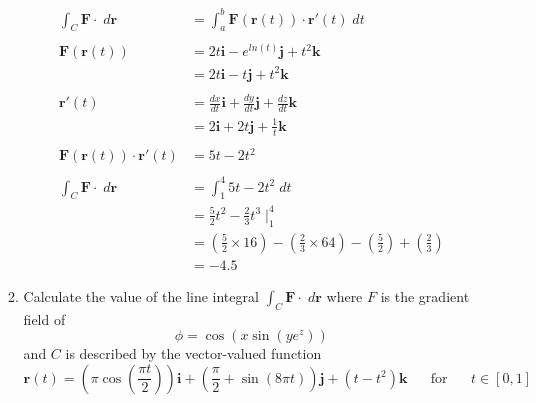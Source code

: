 \documentclass[a4paper,11pt]{article}
\begin{document}
\begin{preview}
\begin{enumerate}
\begin{enumerate}
    \begin{align*}
        \int_C \textbf{F} \cdot \; d \textbf{r} &= \int_a^b \textbf{F}(\textbf{r}(t)) \cdot \textbf{r}' (t) \; dt\\\\
        \textbf{F}(\textbf{r}(t)) &= 2t \textbf{i} - e^{ln(t)} \textbf{j} + t^2 \textbf{k}\\
        &= 2t \textbf{i} - t \textbf{j} + t^2 \textbf{k}\\\\
        \textbf{r}' (t) &= \frac{dx}{dt} \textbf{i} + \frac{dy}{dt} \textbf{j} +  \frac{dz}{dt} \textbf{k}\\
        &= 2 \textbf{i} + 2t \textbf{j} + \frac{1}{t} \textbf{k}\\\\
        \textbf{F}(\textbf{r}(t)) \cdot \textbf{r}' (t) &= 5t - 2t^2 \\\\
        \int_C \textbf{F} \cdot \; d \textbf{r} &= \int_1^4 5t - 2t^2 \; dt\\
        &= \frac{5}{2}t^2 - \frac{2}{3}t^3 \; \Big|_{1}^{4}\\
        &= \left(\frac{5}{2} \times 16\right) - \left(\frac{2}{3} \times 64 \right) - \left(\frac{5}{2}\right) + \left(\frac{2}{3} \right)\\
        &= -4.5
    \end{align*}

    \item Calculate the value of the line integral $\int_C \textbf{F} \cdot \; d \textbf{r}$ where $F$ is the gradient field of $$ \phi = \cos(x \sin(ye^z) ) $$
    and $C$ is described by the vector-valued function 
    $$ \textbf{r}(t) = \left( \pi \cos(\frac{\pi t}{2}) \right) \textbf{i} + \left( \frac{\pi}{2} + \sin(8 \pi t) \right) \textbf{j}  + \left(t-t^2\right) \textbf{k} \;\;\;\;\;\; \mathrm{for} \;\;\;\;\;\; t \in [0,1] $$


\end{enumerate}
\end{enumerate}
\end{preview}
\end{document}
